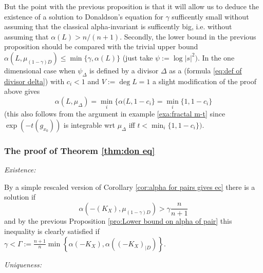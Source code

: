 \documentclass[11pt,oneside,english]{amsart}
\numberwithin{equation}{section}
\numberwithin{figure}{section}
\theoremstyle{plain}
\theoremstyle{plain}
\theoremstyle{plain}
\theoremstyle{plain}
\theoremstyle{remark}
\theoremstyle{definition}
\begin{document}
But the point with the previous proposition is that it will allow
us to deduce the existence of a solution to Donaldson's equation for
$\gamma$ sufficently small without assuming that the classical alpha-invariant
is sufficently big, i.e. without assuming that $\alpha(L)>n/(n+1).$
Secondly, the lower bound in the previous proposition should be compared
with the trivial upper bound $\alpha(L,\mu_{(1-\gamma)D})\leq\min\{\gamma,\alpha(L)\}$
(just take $\psi:=\log|s|^{2}).$ In the one dimensional case when
$\psi_{\Delta}$ is defined by a divisor $\Delta$ as a (formula \ref{eq:def of divisor delta})
with $c_{i}<1$ and $V:=\deg L=1$ a slight modification of the proof
above gives 
\begin{equation}
\alpha(L,\mu_{\Delta})=\min_{i}\{\alpha(L,1-c_{i}\}=\min_{i}\{1,1-c_{i}\}\label{eq:alpha inv troy}
\end{equation}
 (this also follows from the argument in example \ref{exa:fractal m-t}
since $\exp(-t(g_{x_{0}}))$ is integrable wrt $\mu_{\Delta}$ iff
$t<\min_{i}\{1,1-c_{i}\}).$ 

\subsubsection{The proof of Theorem \ref{thm:don eq}}

\emph{Existence:}

By a simple rescaled version of Corollary \ref{cor:alpha for pairs gives ec}
there is a solution if 
\[
\alpha(-(K_{X}),\mu_{(1-\gamma)D})>\gamma\frac{n}{n+1}
\]
 and by the previous Proposition \ref{pro:Lower bound on alpha of pair}
this inequality is clearly satisfied if $\gamma<\Gamma:=\frac{n+1}{n}\min\left\{ \alpha(-K_{X}),\alpha((-K_{X})_{|D})\right\} .$

\emph{Uniqueness: }
\end{document}
